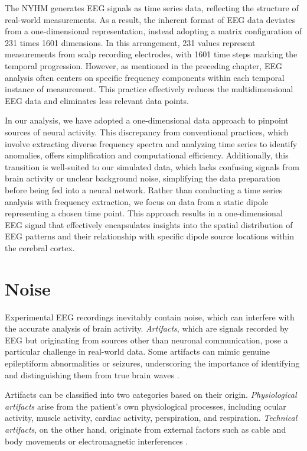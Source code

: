 \documentclass[a4paper, UKenglish, 11pt]{uiomaster}
\begin{document}
The NYHM generates EEG signals as time series data, reflecting the structure of real-world measurements. As a result, the inherent format of EEG data deviates from a one-dimensional representation, instead adopting a matrix configuration of 231 times 1601 dimensions. In this arrangement, 231 values represent measurements from scalp recording electrodes, with 1601 time steps marking the temporal progression. However, as mentioned in the preceding chapter, EEG analysis often centers on specific frequency components within each temporal instance of measurement. This practice effectively reduces the multidimensional EEG data and eliminates less relevant data points.

In our analysis, we have adopted a one-dimensional data approach to pinpoint sources of neural activity. This discrepancy from conventional practices, which involve extracting diverse frequency spectra and analyzing time series to identify anomalies, offers simplification and computational efficiency. Additionally, this transition is well-suited to our simulated data, which lacks confusing signals from brain activity or unclear background noise, simplifying the data preparation before being fed into a neural network. Rather than conducting a time series analysis with frequency extraction, we focus on data from a static dipole representing a chosen time point. This approach results in a one-dimensional EEG signal that effectively encapsulates insights into the spatial distribution of EEG patterns and their relationship with specific dipole source locations within the cerebral cortex.


\section{Noise}
Experimental EEG recordings inevitably contain noise, which can interfere with the accurate analysis of brain activity. \emph{Artifacts}, which are signals recorded by EEG but originating from sources other than neuronal communication, pose a particular challenge in real-world data. Some artifacts can mimic genuine epileptiform abnormalities or seizures, underscoring the importance of identifying and distinguishing them from true brain waves \cite{sazgar2019eeg}.

Artifacts can be classified into two categories based on their origin. \emph{Physiological artifacts} arise from the patient's own physiological processes, including ocular activity, muscle activity, cardiac activity, perspiration, and respiration. \emph{Technical artifacts}, on the other hand, originate from external factors such as cable and body movements or electromagnetic interferences \cite{bitbrain}.
\end{document}
